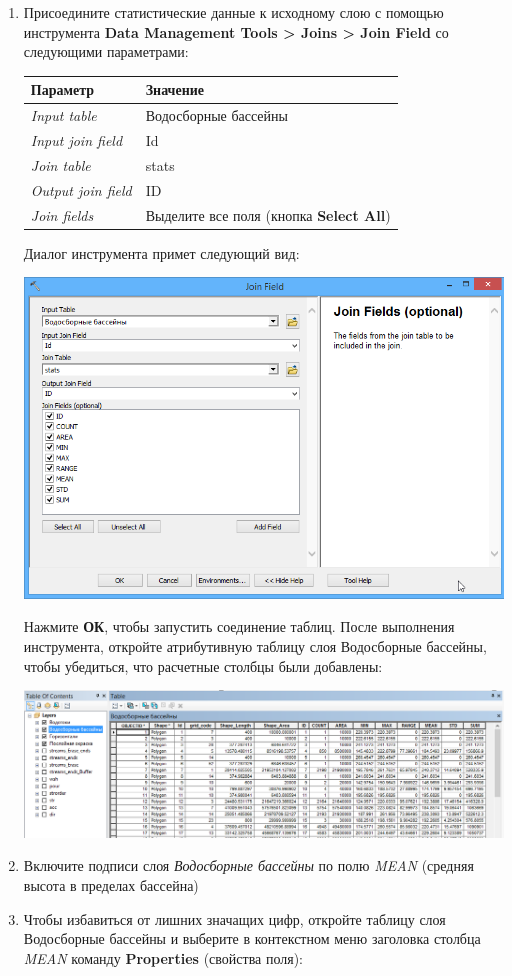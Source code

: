 \documentclass[]{book}
\theoremstyle{definition}
\theoremstyle{definition}
\theoremstyle{definition}
\theoremstyle{remark}
\begin{document}
\begin{enumerate}
\def\labelenumi{\arabic{enumi}.}
\item
  Присоедините статистические данные к исходному слою с помощью
  инструмента \textbf{Data Management Tools \textgreater{} Joins
  \textgreater{} Join Field} со следующими параметрами:

  \begin{longtable}[]{@{}ll@{}}
  \toprule
  Параметр & Значение\tabularnewline
  \midrule
  \endhead
  \emph{Input table} & Водосборные бассейны\tabularnewline
  \emph{Input join field} & Id\tabularnewline
  \emph{Join table} & stats\tabularnewline
  \emph{Output join field} & ID\tabularnewline
  \emph{Join fields} & Выделите все поля (кнопка \textbf{Select
  All})\tabularnewline
  \bottomrule
  \end{longtable}

  Диалог инструмента примет следующий вид:

  \includegraphics{images/Ex17/image27.png}

  Нажмите \textbf{ОК}, чтобы запустить соединение таблиц. После
  выполнения инструмента, откройте атрибутивную таблицу слоя Водосборные
  бассейны, чтобы убедиться, что расчетные столбцы были добавлены:

  \includegraphics{images/Ex17/image28.png}
\item
  Включите подписи слоя \emph{Водосборные бассейны} по полю \emph{MEAN}
  (средняя высота в пределах бассейна)
\item
  Чтобы избавиться от лишних значащих цифр, откройте таблицу слоя
  Водосборные бассейны и выберите в контекстном меню заголовка столбца
  \emph{MEAN} команду \textbf{Properties} (свойства поля):


\end{enumerate}
\end{document}
